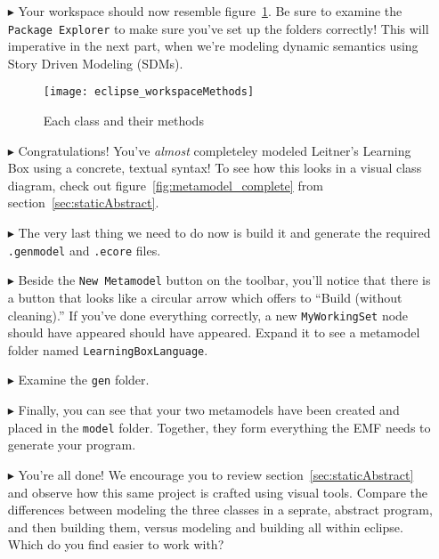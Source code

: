 \begin{itemize}
\item[$\blacktriangleright$] Your workspace should now resemble figure~\ref{fig:workspaceMethods}. Be sure to examine the \texttt{Package Explorer} to make sure you've set up the folders correctly! This will imperative in the next part, when we're modeling dynamic semantics using Story Driven Modeling (SDMs).

\begin{figure}[htbp]
	\centering
  \texttt{[image: eclipse\_workspaceMethods]}
	\caption{Each class and their methods}
	\label{fig:workspaceMethods}
\end{figure}


\item[$\blacktriangleright$] Congratulations! You've \emph{almost} completeley modeled Leitner's Learning Box using a concrete, textual syntax! To see how this looks in a visual class diagram, check out figure~\ref{fig:metamodel_complete} from section~\ref{sec:staticAbstract}.

\item[$\blacktriangleright$]The very last thing we need to do now is build it and generate the required \texttt{.genmodel} and \texttt{.ecore} files. 

\item[$\blacktriangleright$] Beside the \texttt{New Metamodel} button on the toolbar, you'll notice that there is a button that looks like a circular arrow which offers to ``Build (without cleaning).'' %
If you've done everything correctly, a new \texttt{MyWorkingSet} node should have appeared should have appeared. Expand it to see a metamodel folder named \texttt{LearningBoxLanguage}. 

\item[$\blacktriangleright$] Examine the \texttt{gen} folder. %

\item[$\blacktriangleright$] Finally, you can see that your two metamodels have been created and placed in the \texttt{model} folder. Together, they form everything the EMF needs to generate your program.


\item[$\blacktriangleright$] You're all done! We encourage you to review section~\ref{sec:staticAbstract} and observe how this same project is crafted using visual tools. Compare the differences between modeling the three classes in a seprate, abstract program, and then building them, versus modeling and building all within eclipse. Which do you find easier to work with?

\end{itemize}